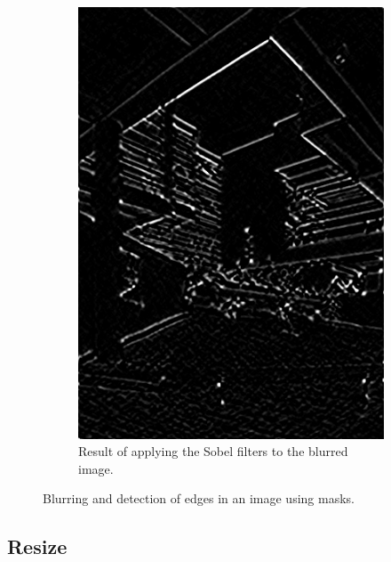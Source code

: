 \documentclass[addpoints]{exam}
\begin{document}
\begin{figure}
\begin{subfigure}[c]{.31\textwidth}
    \includegraphics[width=\textwidth]{campus-edge-detect}
    \caption{Result of applying the Sobel filters to the blurred image.}\label{fig:mask-edge}
  \end{subfigure}
  \caption{Blurring and detection of edges in an image using masks.}
  \label{fig:mask-apply}
\end{figure}

\subsection{Resize}
\end{document}
